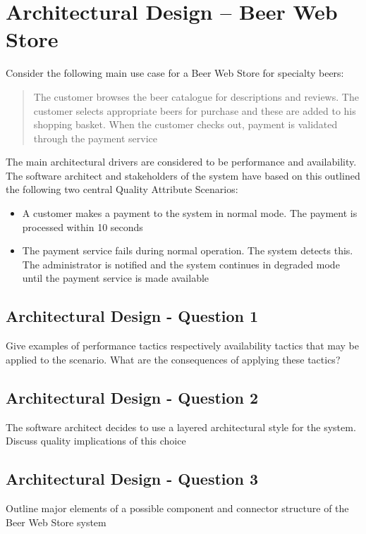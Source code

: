 \section{Architectural Design -- Beer Web Store}
Consider the following main use case for a Beer Web Store for specialty
beers:
\begin{quote}
  The customer browses the beer catalogue for descriptions and
  reviews. The customer selects appropriate beers for purchase and
  these are added to his shopping basket. When the customer checks
  out, payment is validated through the payment service
\end{quote}
The main architectural drivers are considered to be performance and
availability. The software architect and stakeholders of the system
have based on this outlined the following two central Quality
Attribute Scenarios:
\begin{itemize}
  \item A customer makes a payment to the system in normal mode. The
  payment is processed within 10 seconds
  \item The payment service fails during normal operation. The system
  detects this. The administrator is notified and the system continues
  in degraded mode until the payment service is made available
\end{itemize}

\subsection{Architectural Design - Question 1}

\begin{question}
Give examples of performance tactics respectively availability
tactics that may be applied to the scenario. What are the consequences
of applying these tactics?
\end{question}


\subsection{Architectural Design - Question 2}

\begin{question}
The software architect decides to use a layered architectural
style for the system. Discuss quality implications of this choice
\end{question}


\subsection{Architectural Design - Question 3}

\begin{question}
Outline major elements of a possible component and connector
structure of the Beer Web Store system
\end{question}


